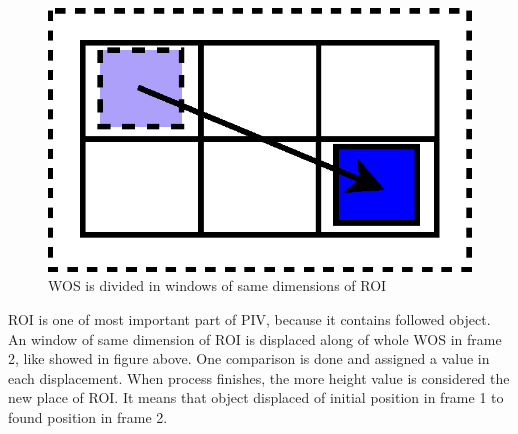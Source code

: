 \begin{figure}[H]
\includegraphics[width=\columnwidth]{images/WOSdivided.eps}
\caption{WOS is divided in windows of same dimensions of ROI}
\label{fig:system}
\end{figure}

ROI is one of most important part of PIV, because it contains followed object. An window of same dimension of ROI is displaced
along of whole WOS in frame 2, like showed in figure above. One comparison is done and assigned a value in each displacement. 
When process finishes, the more height value is considered the new place of ROI. It means that object displaced of initial 
position in frame 1 to found position in frame 2.